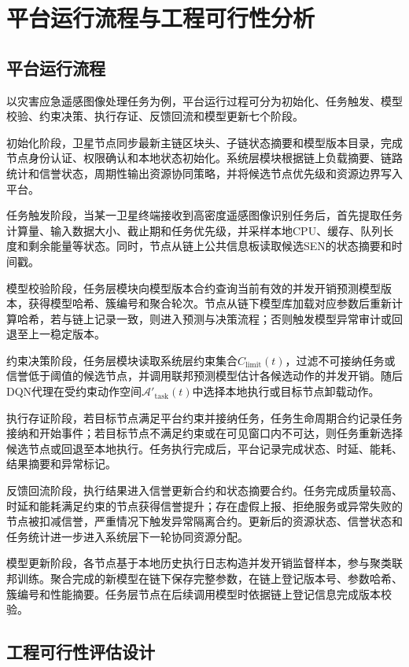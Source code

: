 \section{平台运行流程与工程可行性分析}
\label{sec:platform_evaluation}

\subsection{平台运行流程}

以灾害应急遥感图像处理任务为例，平台运行过程可分为初始化、任务触发、模型校验、约束决策、执行存证、反馈回流和模型更新七个阶段。

初始化阶段，卫星节点同步最新主链区块头、子链状态摘要和模型版本目录，完成节点身份认证、权限确认和本地状态初始化。系统层模块根据链上负载摘要、链路统计和信誉状态，周期性输出资源协同策略，并将候选节点优先级和资源边界写入平台。

任务触发阶段，当某一卫星终端接收到高密度遥感图像识别任务后，首先提取任务计算量、输入数据大小、截止期和任务优先级，并采样本地CPU、缓存、队列长度和剩余能量等状态。同时，节点从链上公共信息板读取候选SEN的状态摘要和时间戳。

模型校验阶段，任务层模块向模型版本合约查询当前有效的并发开销预测模型版本，获得模型哈希、簇编号和聚合轮次。节点从链下模型库加载对应参数后重新计算哈希，若与链上记录一致，则进入预测与决策流程；否则触发模型异常审计或回退至上一稳定版本。

约束决策阶段，任务层模块读取系统层约束集合\(C_{\mathrm{limit}}(t)\)，过滤不可接纳任务或信誉低于阈值的候选节点，并调用联邦预测模型估计各候选动作的并发开销。随后DQN代理在受约束动作空间\(\mathcal{A}'_{\mathrm{task}}(t)\)中选择本地执行或目标节点卸载动作。

执行存证阶段，若目标节点满足平台约束并接纳任务，任务生命周期合约记录任务接纳和开始事件；若目标节点不满足约束或在可见窗口内不可达，则任务重新选择候选节点或回退至本地执行。任务执行完成后，平台记录完成状态、时延、能耗、结果摘要和异常标记。

反馈回流阶段，执行结果进入信誉更新合约和状态摘要合约。任务完成质量较高、时延和能耗满足约束的节点获得信誉提升；存在虚假上报、拒绝服务或异常失败的节点被扣减信誉，严重情况下触发异常隔离合约。更新后的资源状态、信誉状态和任务统计进一步进入系统层下一轮协同资源分配。

模型更新阶段，各节点基于本地历史执行日志构造并发开销监督样本，参与聚类联邦训练。聚合完成的新模型在链下保存完整参数，在链上登记版本号、参数哈希、簇编号和性能摘要。任务层节点在后续调用模型时依据链上登记信息完成版本校验。

\subsection{工程可行性评估设计}

